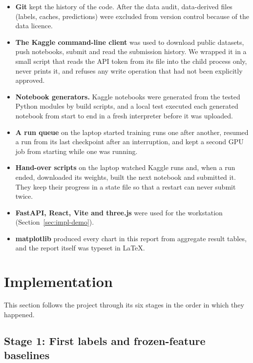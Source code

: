 \begin{itemize}[leftmargin=1.4em]
\item \textbf{Git} kept the history of the code. After the data audit, data-derived files (labels, caches, predictions) were excluded from version control because of the data licence.
\item \textbf{The Kaggle command-line client} \cite{kaggle_cli} was used to download public datasets, push notebooks, submit and read the submission history. We wrapped it in a small script that reads the API token from its file into the child process only, never prints it, and refuses any write operation that had not been explicitly approved.
\item \textbf{Notebook generators.} Kaggle notebooks were generated from the tested Python modules by build scripts, and a local test executed each generated notebook from start to end in a fresh interpreter before it was uploaded.
\item \textbf{A run queue} on the laptop started training runs one after another, resumed a run from its last checkpoint after an interruption, and kept a second GPU job from starting while one was running.
\item \textbf{Hand-over scripts} on the laptop watched Kaggle runs and, when a run ended, downloaded its weights, built the next notebook and submitted it. They keep their progress in a state file so that a restart can never submit twice.
\item \textbf{FastAPI, React, Vite and three.js} were used for the workstation (Section~\ref{sec:impl-demo}).
\item \textbf{matplotlib} produced every chart in this report from aggregate result tables, and the report itself was typeset in \LaTeX.
\end{itemize}

\section{Implementation}
\label{sec:implementation}

This section follows the project through its six stages in the order in which they happened.

\subsection{Stage 1: First labels and frozen-feature baselines}
\label{sec:impl-stage1}

